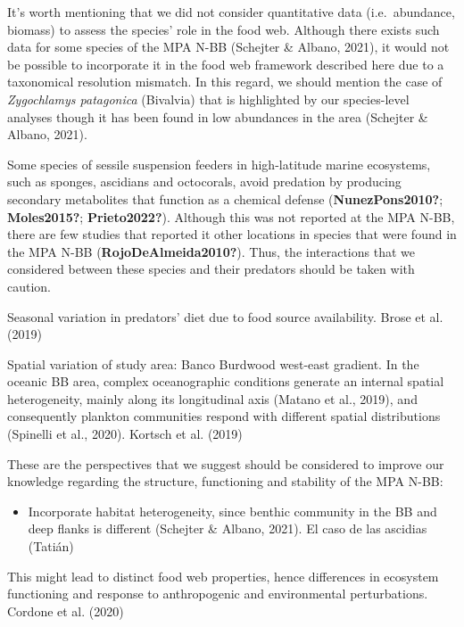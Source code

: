 \documentclass[preprint, 3p,
authoryear]{elsarticle} %
\providecommand{\tightlist}{%
  \setlength{\itemsep}{0pt}\setlength{\parskip}{0pt}}
\begin{document}
It's worth mentioning that we did not consider quantitative data
(i.e.~abundance, biomass) to assess the species' role in the food web.
Although there exists such data for some species of the MPA N-BB
(Schejter \& Albano, 2021), it would not be possible to incorporate it
in the food web framework described here due to a taxonomical resolution
mismatch. In this regard, we should mention the case of
\emph{Zygochlamys patagonica} (Bivalvia) that is highlighted by our
species-level analyses though it has been found in low abundances in the
area (Schejter \& Albano, 2021).

Some species of sessile suspension feeders in high-latitude marine
ecosystems, such as sponges, ascidians and octocorals, avoid predation
by producing secondary metabolites that function as a chemical defense
(\textbf{NunezPons2010?}; \textbf{Moles2015?}; \textbf{Prieto2022?}).
Although this was not reported at the MPA N-BB, there are few studies
that reported it other locations in species that were found in the MPA
N-BB (\textbf{RojoDeAlmeida2010?}). Thus, the interactions that we
considered between these species and their predators should be taken
with caution.

Seasonal variation in predators' diet due to food source availability.
Brose et al. (2019)

Spatial variation of study area: Banco Burdwood west-east gradient. In
the oceanic BB area, complex oceanographic conditions generate an
internal spatial heterogeneity, mainly along its longitudinal axis
(Matano et al., 2019), and consequently plankton communities respond
with different spatial distributions (Spinelli et al., 2020). Kortsch et
al. (2019)

These are the perspectives that we suggest should be considered to
improve our knowledge regarding the structure, functioning and stability
of the MPA N-BB:

\begin{itemize}
\tightlist
\item
  Incorporate habitat heterogeneity, since benthic community in the BB
  and deep flanks is different (Schejter \& Albano, 2021). El caso de
  las ascidias (Tatián)
\end{itemize}

This might lead to distinct food web properties, hence differences in
ecosystem functioning and response to anthropogenic and environmental
perturbations. Cordone et al. (2020)
\end{document}
